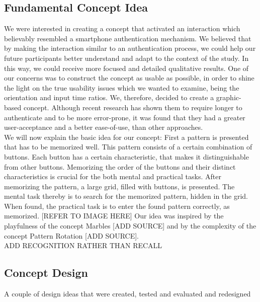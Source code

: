 \subsection{Fundamental Concept Idea}
We were interested in creating a concept that activated an interaction which believably resembled a smartphone authentication mechanism. We believed that by making the interaction similar to an authentication process, we could help our future participants better understand and adapt to the context of the study. In this way, we could receive more focused and detailed qualitative results. One of our concerns was to construct the concept as usable as possible, in order to shine the light on the true usability issues which we wanted to examine, being the orientation and input time ratios. We, therefore, decided to create a graphic-based concept. Although recent research has shown them to require longer to authenticate and to be more error-prone, it was found that they had a greater user-acceptance and a better ease-of-use, than other approaches. \\
We will now explain the basic idea for our concept: First a pattern is presented that has to be memorized well. This pattern consists of a certain combination of buttons. Each button has a certain characteristic, that makes it distinguishable from other buttons. Memorizing the order of the buttons and their distinct characteristics is crucial for the both mental and practical tasks. After memorizing the pattern, a large grid, filled with buttons, is presented. The mental task thereby is to search for the memorized pattern, hidden in the grid. When found, the practical task is to enter the found pattern correctly, as memorized. [REFER TO IMAGE HERE] Our idea was inspired by the playfulness of the concept Marbles [ADD SOURCE] and by the complexity of the concept Pattern Rotation [ADD SOURCE]. \\

ADD RECOGNITION RATHER THAN RECALL 

\subsection{Concept Design}
A couple of design ideas that were created, tested and evaluated and redesigned 

